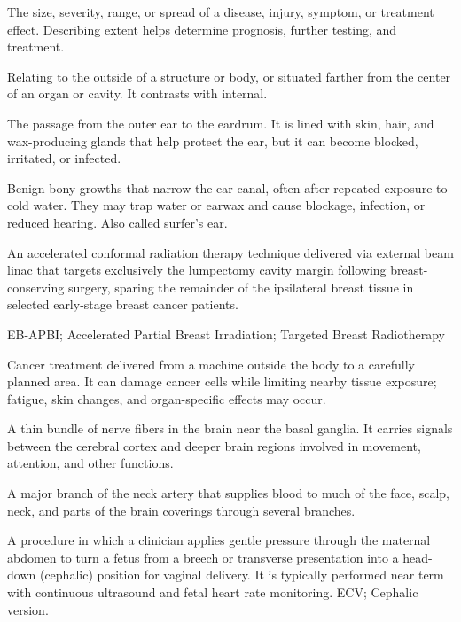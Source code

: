  The size, severity, range, or spread of a disease, injury, symptom, or treatment effect. Describing extent helps determine prognosis, further testing, and treatment.

 Relating to the outside of a structure or body, or situated farther from the center of an organ or cavity. It contrasts with internal.

 The passage from the outer ear to the eardrum. It is lined with skin, hair, and wax-producing glands that help protect the ear, but it can become blocked, irritated, or infected.

 Benign bony growths that narrow the ear canal, often after repeated exposure to cold water. They may trap water or earwax and cause blockage, infection, or reduced hearing. Also called surfer's ear.

 An accelerated conformal radiation therapy technique delivered via external beam linac that targets exclusively the lumpectomy cavity margin following breast-conserving surgery, sparing the remainder of the ipsilateral breast tissue in selected early-stage breast cancer patients.

\synonyms
EB-APBI; Accelerated Partial Breast Irradiation; Targeted Breast Radiotherapy

 Cancer treatment delivered from a machine outside the body to a carefully planned area. It can damage cancer cells while limiting nearby tissue exposure; fatigue, skin changes, and organ-specific effects may occur.

 A thin bundle of nerve fibers in the brain near the basal ganglia. It carries signals between the cerebral cortex and deeper brain regions involved in movement, attention, and other functions.

 A major branch of the neck artery that supplies blood to much of the face, scalp, neck, and parts of the brain coverings through several branches.

 A procedure in which a clinician applies gentle pressure through the maternal abdomen to turn a fetus from a breech or transverse presentation into a head-down (cephalic) position for vaginal delivery. It is typically performed near term with continuous ultrasound and fetal heart rate monitoring.
\synonyms ECV; Cephalic version.

